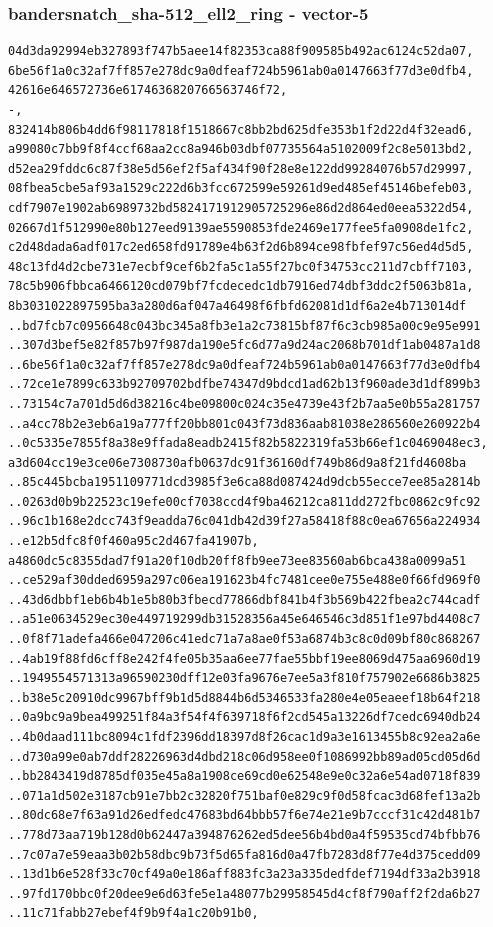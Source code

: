 \documentclass[
]{article}
\begin{document}
\subsubsection{bandersnatch\_sha-512\_ell2\_ring -
vector-5}\label{bandersnatch_sha-512_ell2_ring---vector-5}

\begin{verbatim}
04d3da92994eb327893f747b5aee14f82353ca88f909585b492ac6124c52da07,
6be56f1a0c32af7ff857e278dc9a0dfeaf724b5961ab0a0147663f77d3e0dfb4,
42616e646572736e6174636820766563746f72,
-,
832414b806b4dd6f98117818f1518667c8bb2bd625dfe353b1f2d22d4f32ead6,
a99080c7bb9f8f4ccf68aa2cc8a946b03dbf07735564a5102009f2c8e5013bd2,
d52ea29fddc6c87f38e5d56ef2f5af434f90f28e8e122dd99284076b57d29997,
08fbea5cbe5af93a1529c222d6b3fcc672599e59261d9ed485ef45146befeb03,
cdf7907e1902ab6989732bd5824171912905725296e86d2d864ed0eea5322d54,
02667d1f512990e80b127eed9139ae5590853fde2469e177fee5fa0908de1fc2,
c2d48dada6adf017c2ed658fd91789e4b63f2d6b894ce98fbfef97c56ed4d5d5,
48c13fd4d2cbe731e7ecbf9cef6b2fa5c1a55f27bc0f34753cc211d7cbff7103,
78c5b906fbbca6466120cd079bf7fcdecedc1db7916ed74dbf3ddc2f5063b81a,
8b3031022897595ba3a280d6af047a46498f6fbfd62081d1df6a2e4b713014df
..bd7fcb7c0956648c043bc345a8fb3e1a2c73815bf87f6c3cb985a00c9e95e991
..307d3bef5e82f857b97f987da190e5fc6d77a9d24ac2068b701df1ab0487a1d8
..6be56f1a0c32af7ff857e278dc9a0dfeaf724b5961ab0a0147663f77d3e0dfb4
..72ce1e7899c633b92709702bdfbe74347d9bdcd1ad62b13f960ade3d1df899b3
..73154c7a701d5d6d38216c4be09800c024c35e4739e43f2b7aa5e0b55a281757
..a4cc78b2e3eb6a19a777ff20bb801c043f73d836aab81038e286560e260922b4
..0c5335e7855f8a38e9ffada8eadb2415f82b5822319fa53b66ef1c0469048ec3,
a3d604cc19e3ce06e7308730afb0637dc91f36160df749b86d9a8f21fd4608ba
..85c445bcba1951109771dcd3985f3e6ca88d087424d9dcb55ecce7ee85a2814b
..0263d0b9b22523c19efe00cf7038ccd4f9ba46212ca811dd272fbc0862c9fc92
..96c1b168e2dcc743f9eadda76c041db42d39f27a58418f88c0ea67656a224934
..e12b5dfc8f0f460a95c2d467fa41907b,
a4860dc5c8355dad7f91a20f10db20ff8fb9ee73ee83560ab6bca438a0099a51
..ce529af30dded6959a297c06ea191623b4fc7481cee0e755e488e0f66fd969f0
..43d6dbbf1eb6b4b1e5b80b3fbecd77866dbf841b4f3b569b422fbea2c744cadf
..a51e0634529ec30e449719299db31528356a45e646546c3d851f1e97bd4408c7
..0f8f71adefa466e047206c41edc71a7a8ae0f53a6874b3c8c0d09bf80c868267
..4ab19f88fd6cff8e242f4fe05b35aa6ee77fae55bbf19ee8069d475aa6960d19
..1949554571313a96590230dff12e03fa9676e7ee5a3f810f757902e6686b3825
..b38e5c20910dc9967bff9b1d5d8844b6d5346533fa280e4e05eaeef18b64f218
..0a9bc9a9bea499251f84a3f54f4f639718f6f2cd545a13226df7cedc6940db24
..4b0daad111bc8094c1fdf2396dd18397d8f26cac1d9a3e1613455b8c92ea2a6e
..d730a99e0ab7ddf28226963d4dbd218c06d958ee0f1086992bb89ad05cd05d6d
..bb2843419d8785df035e45a8a1908ce69cd0e62548e9e0c32a6e54ad0718f839
..071a1d502e3187cb91e7bb2c32820f751baf0e829c9f0d58fcac3d68fef13a2b
..80dc68e7f63a91d26edfedc47683bd64bbb57f6e74e21e9b7cccf31c42d481b7
..778d73aa719b128d0b62447a394876262ed5dee56b4bd0a4f59535cd74bfbb76
..7c07a7e59eaa3b02b58dbc9b73f5d65fa816d0a47fb7283d8f77e4d375cedd09
..13d1b6e528f33c70cf49a0e186aff883fc3a23a335dedfdef7194df33a2b3918
..97fd170bbc0f20dee9e6d63fe5e1a48077b29958545d4cf8f790aff2f2da6b27
..11c71fabb27ebef4f9b9f4a1c20b91b0,
\end{verbatim}
\end{document}
